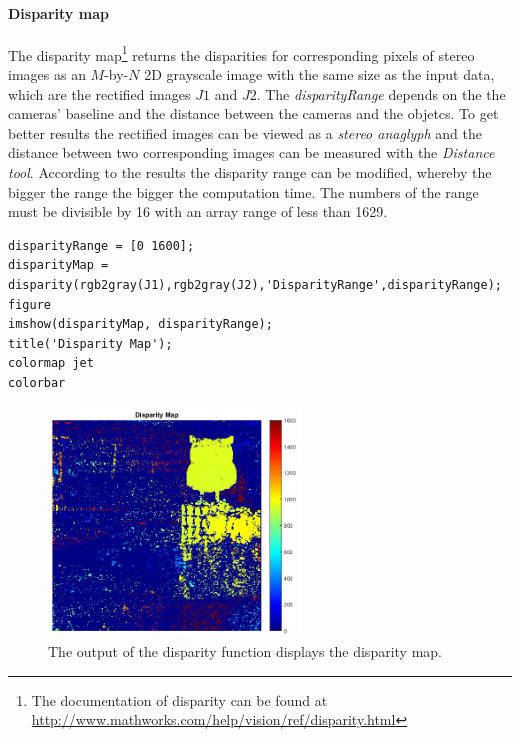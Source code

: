 \paragraph{Disparity map}
The disparity map\footnote{The documentation of disparity can be found at \url{http://www.mathworks.com/help/vision/ref/disparity.html}} returns the disparities for corresponding pixels of stereo images as an $M$-by-$N$ 2D grayscale image with the same size as the input data, which are the rectified images $J1$ and $J2$. The \textit{disparityRange} depends on the the cameras' baseline and the distance between the cameras and the objetcs. To get better results the rectified images can be viewed as a \textit{stereo anaglyph} and the distance between two corresponding images can be measured with the \textit{Distance tool}. According to the results the disparity range can be modified, whereby the bigger the range the bigger the computation time. The numbers of the range must be divisible by 16 with an array range of less than 1629.  

\begin{lstlisting}[caption={Display disparity map.}]
disparityRange = [0 1600];
disparityMap = disparity(rgb2gray(J1),rgb2gray(J2),'DisparityRange',disparityRange); 
figure
imshow(disparityMap, disparityRange);
title('Disparity Map');
colormap jet
colorbar
\end{lstlisting}

\begin{figure}[htbp]
		\centering
		\includegraphics[width=0.6\textwidth]{figures/DisparityMap}
		\caption[Output of the disparity function]{The output of the disparity function displays the disparity map.}
		\label{fig:DisparityMap}
\end{figure}

